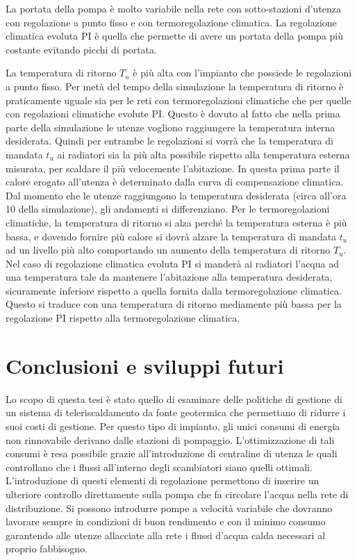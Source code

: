 \documentclass[laurea,oneside,11pt]{USiena_tesiLM3}
\begin{document}
La portata della pompa è molto variabile nella rete con sotto-stazioni d'utenza con regolazione a punto fisso e con termoregolazione climatica. La regolazione climatica evoluta PI è quella che permette di avere un portata della pompa più costante evitando picchi di portata.

La temperatura di ritorno $T_u$  è più alta con l'impianto che possiede le regolazioni a punto fisso. Per metà del tempo della simulazione la temperatura di ritorno è praticamente uguale sia per le reti con termoregolazioni climatiche che per quelle con regolazioni climatiche evolute PI. Questo è dovuto al fatto che nella prima parte della simulazione le utenze vogliono raggiungere la temperatura interna desiderata. Quindi per entrambe le regolazioni si vorrà che la temperatura di mandata $t_u$ ai radiatori sia la più alta possibile rispetto alla temperatura esterna misurata, per scaldare il più velocemente l'abitazione. In questa prima parte il calore erogato all'utenza è determinato dalla curva di compensazione climatica. Dal momento che le utenze raggiungono la temperatura desiderata (circa all'ora 10 della simulazione), gli andamenti si differenziano. Per le termoregolazioni climatiche, la temperatura di ritorno si alza perché la  temperatura esterna è più bassa, e dovendo fornire più calore  si dovrà alzare la temperatura di mandata $t_u$ ad un livello più alto comportando un aumento della temperatura di ritorno $T_u$. Nel caso di regolazione climatica evoluta PI si manderà ai radiatori l'acqua ad una temperatura tale da mantenere l'abitazione alla temperatura desiderata, sicuramente inferiore rispetto a quella fornita dalla termoregolazione climatica. Questo si traduce con una temperatura di ritorno mediamente più bassa per la regolazione PI rispetto alla termoregolazione climatica.

\chapter{Conclusioni e sviluppi futuri}

Lo scopo di questa tesi è stato quello di esaminare delle politiche di gestione di un sistema di teleriscaldamento da fonte geotermica che permettano di ridurre i suoi costi di gestione. Per questo tipo di impianto, gli unici consumi di energia non rinnovabile derivano dalle stazioni di pompaggio. L'ottimizzazione di tali consumi è resa possibile grazie all'introduzione di centraline di utenza le quali controllano che i flussi all'interno degli scambiatori siano quelli ottimali. L'introduzione di questi elementi di regolazione permettono di inserire un ulteriore controllo direttamente sulla pompa che fa circolare l'acqua nella rete di distribuzione. Si possono introdurre pompe a velocità variabile  che dovranno lavorare sempre in condizioni di buon rendimento e con il minimo consumo garantendo alle utenze allacciate alla rete i flussi d'acqua calda necessari al proprio fabbisogno. 
\end{document}
